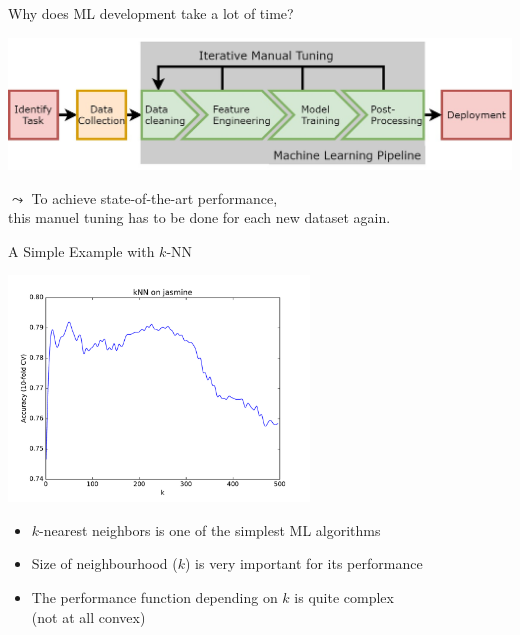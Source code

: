 \begin{frame}[c]{Why does ML development take a lot of time?}

\centering
\includegraphics[width=1.0\textwidth]{images/MLPipeline.jpg}

\bigskip\bigskip\bigskip\bigskip
$\leadsto$ To achieve state-of-the-art performance,\\ this manuel tuning has to be done for each new dataset again.

\end{frame}
\begin{frame}[c]{A Simple Example with $k$-NN}

\centering
\includegraphics[width=0.6\textwidth]{images/kNN-jasmine}

\begin{itemize}
  \item $k$-nearest neighbors is one of the simplest ML algorithms
  \item Size of neighbourhood ($k$) is very important for its performance
  \pause
  \item The performance function depending on $k$ is quite complex\\ (not at all convex)
\end{itemize}

\end{frame}
